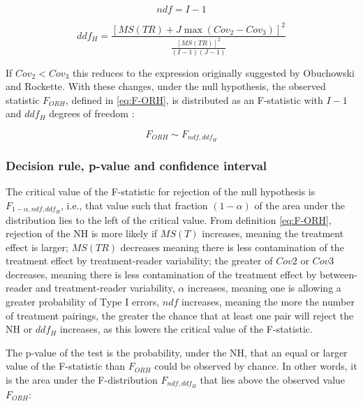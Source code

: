 \documentclass[
]{book}
\begin{document}
\begin{equation}
ndf=I-1
\label{eq:ndf}
\end{equation}

\begin{equation}
ddf_H=\frac{\left [ MS(TR) + J \max(Cov_2-Cov_3)\right ]^2}{\frac{\left [ MS(TR) \right ]^2}{(I-1)(J-1)}}
\label{eq:ddfH}
\end{equation}

If \(Cov_2<Cov_3\) this reduces to the expression originally suggested by Obuchowski and Rockette. With these changes, under the null hypothesis, the observed statistic \(F_{ORH}\), defined in \eqref{eq:F-ORH}, is distributed as an F-statistic with \(I-1\) and \(ddf_H\) degrees of freedom \citep{RN1772, RN1865, RN1866}:

\begin{equation}
F_{ORH}\sim F_{ndf,ddf_H}
\label{eq:SamplingDistrF-ORH}
\end{equation}

\hypertarget{decision-rule-p-value-and-confidence-interval}{%
\subsubsection{Decision rule, p-value and confidence interval}\label{decision-rule-p-value-and-confidence-interval}}

The critical value of the F-statistic for rejection of the null hypothesis is \(F_{1-\alpha,ndf,ddf_H}\), i.e., that value such that fraction \((1-\alpha)\) of the area under the distribution lies to the left of the critical value. From definition \eqref{eq:F-ORH}, rejection of the NH is more likely if \(MS(T)\) increases, meaning the treatment effect is larger; \(MS(TR)\) decreases meaning there is less contamination of the treatment effect by treatment-reader variability; the greater of \(Cov2\) or \(Cov3\) decreases, meaning there is less contamination of the treatment effect by between-reader and treatment-reader variability, \(\alpha\) increases, meaning one is allowing a greater probability of Type I errors, \(ndf\) increases, meaning the more the number of treatment pairings, the greater the chance that at least one pair will reject the NH or \(ddf_H\) increases, as this lowers the critical value of the F-statistic.

The p-value of the test is the probability, under the NH, that an equal or larger value of the F-statistic than \(F_{ORH}\) could be observed by chance. In other words, it is the area under the F-distribution \(F_{ndf,ddf_H}\) that lies above the observed value \(F_{ORH}\):
\end{document}
